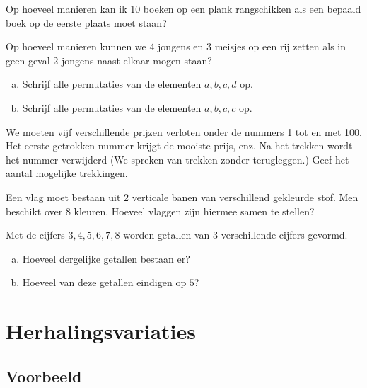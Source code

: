 \documentclass[12pt,a4paper,twoside]{article}
\begin{document}
\begin{oefening}
Op hoeveel manieren kan ik 10 boeken op een plank rangschikken als een bepaald boek op de eerste plaats moet staan?
\end{oefening}

\begin{oefening}
Op hoeveel manieren kunnen we 4 jongens en 3 meisjes op een rij zetten als in geen geval 2 jongens naast elkaar mogen staan?
\end{oefening}

\begin{oefening}
\begin{enumerate}[(a)]
  \item Schrijf alle permutaties van de elementen $a,b,c,d$ op.
  \item Schrijf alle permutaties van de elementen $a,b,c,c$ op.
\end{enumerate}
\end{oefening}

\begin{oefening}
We moeten vijf verschillende prijzen verloten onder de nummers 1 tot en met 100.
Het eerste getrokken nummer krijgt de mooiste prijs, enz. Na het trekken wordt het
nummer verwijderd (We spreken van trekken zonder terugleggen.)
Geef het aantal mogelijke trekkingen.
\end{oefening}

\begin{oefening}
Een vlag moet bestaan uit 2 verticale banen van verschillend gekleurde stof.
Men beschikt over 8 kleuren. Hoeveel vlaggen zijn hiermee samen te stellen?
\end{oefening}

\begin{oefening}
Met de cijfers $3, 4, 5, 6, 7, 8$ worden getallen van $3$ verschillende cijfers gevormd.
\begin{enumerate}[(a)]
  \item Hoeveel dergelijke getallen bestaan er?
  \item Hoeveel van deze getallen eindigen op $5$?
\end{enumerate}
\end{oefening}

\pagebreak
\section{Herhalingsvariaties}

\subsection{Voorbeeld}
\end{document}
